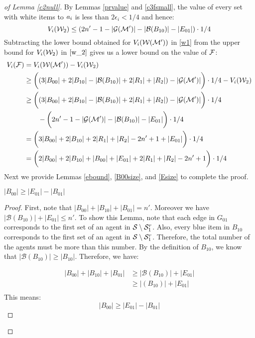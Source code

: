\begin{proof}[of Lemma \ref{c2null}]
By Lemmas \ref{prvalue} and \ref{c3fsmall}, the value of every set with white items to $a_i$ is less than $2\epsilon_i<1/4$ and hence:
\begin{equation}
\label{w_2}
V_i(\mathcal{W}_2) \leq (2n' - 1 - |{\mathcal{G}}(\mathcal{M}')| - |{\mathcal{B}}(B_{10})| - |E_{01}|)\cdot 1/4
\end{equation}
Subtracting the lower bound obtained for $V_i(\mathcal{W}(\mathcal{M}'))$ in \eqref{w1} from the upper bound for $V_i(\mathcal{W}_2)$ in $\eqref{w_2}$ gives us a lower bound on the value of $\mathcal{F}$:
\begin{equation}\label{bachekhoshgel}
\begin{split}
V_i(\mathcal{F}) &= V_i(\mathcal{W}(\mathcal{M}')) - V_i(\mathcal{W}_2)\\
 &\geq \bigg((3|B_{00}| + 2|B_{10}| -|{\mathcal{B}}(B_{10})| + 2|R_1| + |R_2|) -  |{\mathcal{G}}(\mathcal{M}')| \bigg)\cdot 1/4 - V_i(\mathcal{W}_2)\\
 &\geq \bigg((3|B_{00}| + 2|B_{10}| - |{\mathcal{B}}(B_{10})| + 2|R_1| + |R_2|) -  |{\mathcal{G}}(\mathcal{M}')| \bigg)\cdot 1/4\\
 & \qquad - \bigg(2n' - 1 - |{\mathcal{G}}(\mathcal{M}')| - |{\mathcal{B}}(B_{10})| - |E_{01}|\bigg)\cdot 1/4 \\
&= \bigg(3|B_{00}|+2|B_{10}| + 2|R_1| + |R_2| -2n' + 1 + |E_{01}| \bigg)\cdot 1/4 \\
&= \bigg(2|B_{00}|+2|B_{10}| + |B_{00}| + |E_{01}| + 2|R_1| + |R_2| - 2n' + 1\bigg) \cdot 1/4 
\end{split}
\end{equation} 
Next we provide Lemmas \ref{ebound}, \ref{B00size}, and \ref{Esize} to complete the proof.
\begin{lemma}
\label{ebound}
$|B_{00}| \geq |E_{01}| - |B_{01}|$ 
\end{lemma}
\begin{proof}
First, note that $|B_{00}| + |B_{10}| + |B_{01}|=n'$. Moreover we have $|{\mathcal B}(B_{10})| + |E_{01}| \leq n'$. To show this Lemma, note that each edge in $G_{01}$ corresponds to the first set of an agent in $\mathcal{S} \setminus \mathcal{S}_1^r$. Also, every blue item in $B_{10}$ corresponds to the first set of an agent in $\mathcal{S} \setminus \mathcal{S}_1^r$. Therefore, the total number of the agents must be more than this number. By the definition of $B_{10}$, we know that $|{\mathcal B}(B_{10})| \geq |B_{10}|$. Therefore, we have: 

\begin{equation}
\begin{split}
|B_{00}| + |B_{10}| + |B_{01}| &\geq  |{\mathcal B}(B_{10})| + |E_{01}|\\
 &\geq |(B_{10})| + |E_{01}|\\
\end{split}
\end{equation} 
This means:
$$ |B_{00}| \geq |E_{01}| - |B_{01}| $$
\end{proof}


\end{proof}
